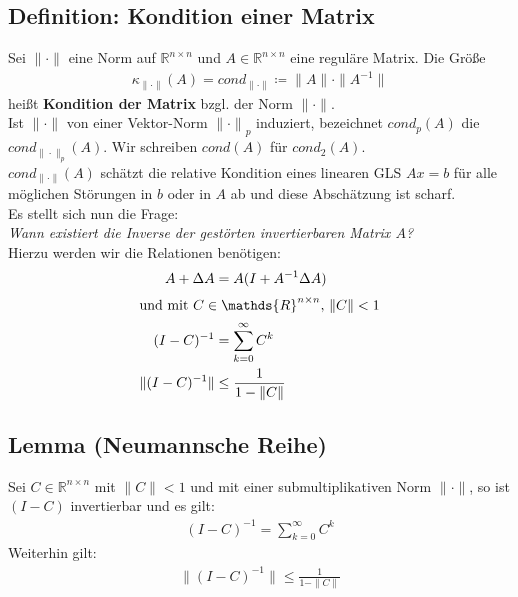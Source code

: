\documentclass[ngerman,fontsize=11pt, paper=a4, parskip=half, titlepage=true, toc=bib]{scrbook}
\newcommand{\R}{\mathds{R}}
\newcommand{\Renn}{\mathds{R}^{n\times n}}
\begin{document}
\subsection{Definition: Kondition einer Matrix} 
Sei $\|\cdot\|$ eine Norm auf $\R^{n\times n} $ und $A\in \R^{n\times n}$ eine reguläre Matrix.
Die Größe
\begin{gather*}
	\kappa_{\|\cdot\|}(A) = cond_{\|\cdot\|} \coloneqq \|A\| \cdot \|A^{-1}\|
\end{gather*}
heißt \textbf{Kondition der Matrix} bzgl. der Norm ${\|\cdot\|}$. \\
Ist  ${\|\cdot\|}$ von einer Vektor-Norm ${\|\cdot\|}_p$ induziert, bezeichnet 
	$cond_p(A)$
die $cond_{\|\cdot\|_p}(A)$. Wir schreiben $cond(A)$ für $cond_2(A)$. \\
$cond_{\|\cdot\|}(A) $ schätzt die relative Kondition eines linearen GLS $Ax=b$ für alle möglichen 
Störungen in $b$ oder in $A$ ab und diese Abschätzung ist scharf. \\

Es stellt sich nun die Frage: \\
\textit{Wann existiert die Inverse der gestörten invertierbaren Matrix $A$?} \\
Hierzu werden wir die Relationen benötigen:
\begin{align*}
	A+\Delta A &= A (I+A^{-1}\Delta A)\\
\intertext{und mit $C \in \Renn,\, \|C\| < 1$}
	(I-C)^{-1} &= \sum_{k=0}^{\infty}C^k \\
	\|	(I-C)^{-1} \| &\leq \frac{1}{1-\|C\|}
\end{align*}

\subsection{Lemma (Neumannsche Reihe)}\label{3.2.12}
\addtocounter{equation}{1}
Sei $C\in\Renn$ mit $\|C\|<1$ und mit einer submultiplikativen Norm $\|\cdot\|$,
so ist $(I-C)$ invertierbar und es gilt:
\begin{gather*}
	(I-C)^{-1}=\sum_{k=0}^{\infty}C^k
\end{gather*}
Weiterhin gilt:
\begin{gather*}
	\|(I-C)^ {-1}\| \leq \frac{1}{1-\|C\|}
\end{gather*}
\end{document}
